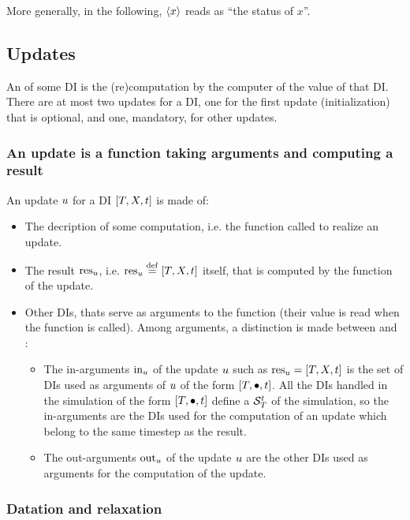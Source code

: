 More generally, in the following, ${\left<{x}\right>}$ reads as ``the status of $x$''.

\subsection{Updates}

An  of some DI is the (re)computation by the \CxSOM computer of the value of that DI. There are at most two updates for a DI, one for the first update (initialization) that is optional, and one, mandatory, for other updates.

\subsubsection{An update is a function taking arguments and computing a result \label{sec:update}}

An update $u$ for a DI ${{\left[T,X,t\right]}}$ is made of:
\begin{itemize}
\item The decription of some computation, i.e. the function called to realize an update.
\item The result $\mathrm{res}_{u}$, i.e. $\mathrm{res}_{u}\stackrel{\mathrm{def}}{=}{{\left[T,X,t\right]}}$ itself, that is computed by the function of the update.
\item Other DIs, thats serve as arguments to the function (their value is read when the function is called). Among arguments, a distinction is made between  and :
  \begin{itemize}
    \item The in-arguments $\mathrm{in}_{u}$ of the update $u$ such as $\mathrm{res}_{u} = {{\left[T,X,t\right]}}$ is the set of DIs used as arguments of $u$ of the form ${\left[T,\bullet,t\right]}$. All the DIs handled in the simulation of the form ${\left[T,\bullet,t\right]}$ define a  ${{{\cal S}_{T}^{t}}}$ of the simulation, so the in-arguments are the DIs used for the computation of an update which belong to the same timestep as the result.
    \item The out-arguments  $\mathrm{out}_{u}$ of the update $u$ are the other DIs used as arguments for the computation of the update.
  \end{itemize}
\end{itemize}

\subsubsection{Datation and relaxation}

